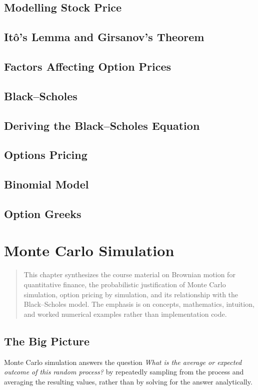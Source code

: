 \documentclass[12pt,openany]{book}
\theoremstyle{definition}
\theoremstyle{remark}
\begin{document}
\section{Modelling Stock Price}
\section{Itô's Lemma and Girsanov's Theorem}
\section{Factors Affecting Option Prices}
\section{Black--Scholes}
\section{Deriving the Black--Scholes Equation}
\section{Options Pricing}
\section{Binomial Model}
\section{Option Greeks}

\chapter{Monte Carlo Simulation}
\label{chap:monte-carlo-simulation}

\begin{quote}
This chapter synthesizes the course material on Brownian motion for
quantitative finance, the probabilistic justification of Monte Carlo
simulation, option pricing by simulation, and its relationship with the
Black--Scholes model. The emphasis is on concepts, mathematics, intuition,
and worked numerical examples rather than implementation code.
\end{quote}

\section{The Big Picture}

Monte Carlo simulation answers the question
\emph{What is the average or expected outcome of this random process?}
by repeatedly sampling from the process and averaging the resulting values,
rather than by solving for the answer analytically.
\end{document}
